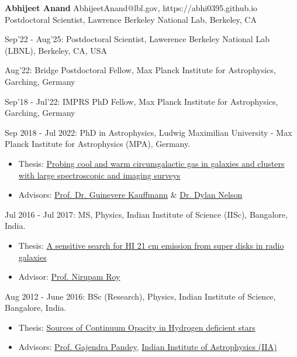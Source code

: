 \documentclass[12pt,letterpaper]{article}
\begin{document}
\thispagestyle{empty}\sloppy\sloppypar\raggedbottom

\textbf{\Large Abhijeet Anand} \hfill
\textsf{\small AbhijeetAnand@lbl.gov, https://abhi0395.github.io} \\[0.5ex]
Postdoctoral Scientist, Lawrence Berkeley National Lab, Berkeley, CA\\[0.5ex]

\begin{list}{}{\cvlist}
\item
Sep'22 - Aug'25: Postdoctoral Scientist, Lawerence Berkeley National Lab (LBNL), Berkeley, CA, USA
\item
Aug'22: Bridge Postdoctoral Fellow, Max Planck Institute for Astrophysics, Garching, Germany
\item
Sep'18 - Jul'22: IMPRS PhD Fellow, Max Planck Institute for Astrophysics, Garching, Germany
\end{list}

\begin{list}{}{\cvlist}
\item Sep 2018 - Jul 2022: PhD in Astrophysics, Ludwig Maximilian University - Max Planck Institute for Astrophysics (MPA), Germany.
\begin{itemize}
    \item Thesis: \href{https://edoc.ub.uni-muenchen.de/30337/}{Probing cool and warm circumgalactic gas in galaxies and clusters with large spectroscopic and imaging surveys}
    \item Advisors: \href{https://www.mpa-garching.mpg.de/galaxyformation}{Prof. Dr. Guinevere Kauffmann} \& \href{https://www.ita.uni-heidelberg.de/~dnelson/}{Dr. Dylan Nelson}
\end{itemize}

\item Jul 2016 - Jul 2017: MS, Physics, Indian Institute of Science (IISc), Bangalore, India.
\begin{itemize}
    \item Thesis: \href{/files/MS_thesis.pdf}{A sensitive search for HI 21 cm emission from super disks in radio galaxies}
    \item Advisor: \href{http://www.physics.iisc.ernet.in/%7Enroy/}{Prof. Nirupam Roy}
  \end{itemize}
\item Aug 2012 - June 2016: BSc (Research), Physics, Indian Institute of Science, Bangalore, India.
\begin{itemize}
    \item Thesis: \href{/files/BS_thesis.pdf}{Sources of Continuum Opacity in Hydrogen deficient stars}
    \item Advisors: \href{https://www.iiap.res.in/?q=user/29}{Prof. Gajendra Pandey}, \href{https://www.iiap.res.in/}{Indian Institute of Astrophysics (IIA)}
  \end{itemize}
\end{list}
\end{document}
